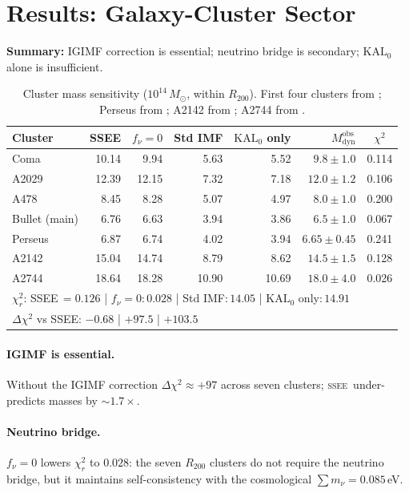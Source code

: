 \documentclass[12pt,a4paper]{article}
\newcommand{\SSEE}{\ifmmode\mathrm{SSEE}\else\textsc{ssee}\fi}
\newcommand{\KALz}{\mathrm{KAL}_0}
\newcommand{\Mobs}{M^{\mathrm{obs}}_{\mathrm{dyn}}}
\begin{document}
\section{Results: Galaxy-Cluster Sector}
\label{sec:results_clusters}

\noindent\textbf{Summary:} IGIMF correction is essential; neutrino bridge is secondary; $\KALz$ alone is insufficient.

\begin{table}[H]
\centering
\caption{Cluster mass sensitivity ($10^{14}\,M_\odot$, within $R_{200}$).
First four clusters from \citet{Zhang2026}; Perseus from \citet{Simionescu2011};
A2142 from \citet{Tchernin2016}; A2744 from \citet{Merten2011}.}
\label{tab:cluster_sensitivity}
\small
\begin{tabular}{lrrrrrc}
\toprule
Cluster & SSEE & $f_\nu{=}0$ & Std IMF & $\KALz$ only & $\Mobs$ & $\chi^2$ \\
\midrule
Coma          & 10.14 &  9.94 & 5.63 & 5.52 & $9.8\pm1.0$   & 0.114 \\
A2029         & 12.39 & 12.15 & 7.32 & 7.18 & $12.0\pm1.2$  & 0.106 \\
A478          &  8.45 &  8.28 & 5.07 & 4.97 & $8.0\pm1.0$   & 0.200 \\
Bullet (main) &  6.76 &  6.63 & 3.94 & 3.86 & $6.5\pm1.0$   & 0.067 \\
Perseus       &  6.87 &  6.74 & 4.02 & 3.94 & $6.65\pm0.45$ & 0.241 \\
A2142         & 15.04 & 14.74 & 8.79 & 8.62 & $14.5\pm1.5$  & 0.128 \\
A2744         & 18.64 & 18.28 &10.90 &10.69 & $18.0\pm4.0$  & 0.026 \\
\midrule
\multicolumn{7}{l}{$\chi^2_r$: SSEE\,$=0.126$ \;|\; $f_\nu{=}0$:\,$0.028$ \;|\;
  Std IMF:\,$14.05$ \;|\; $\KALz$ only:\,$14.91$} \\
\multicolumn{7}{l}{$\Delta\chi^2$ vs SSEE: $-0.68$ \;|\; $+97.5$ \;|\; $+103.5$} \\
\bottomrule
\end{tabular}
\end{table}

\paragraph{IGIMF is essential.}
Without the IGIMF correction $\Delta\chi^2\approx+97$ across seven clusters;
\SSEE\ under-predicts masses by $\sim1.7\times$.

\paragraph{Neutrino bridge.}
$f_\nu=0$ lowers $\chi^2_r$ to $0.028$: the seven $R_{200}$ clusters
do not require the neutrino bridge, but it maintains self-consistency
with the cosmological $\sum m_\nu=0.085$\,eV.
\end{document}
